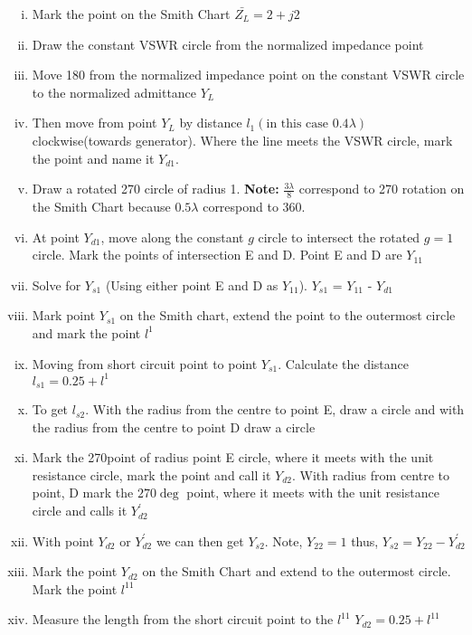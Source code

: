 \begin{exmp}
\begin{enumerate}[(i)]
\item Mark the point on the Smith Chart $\bar{Z_{L}} = 2 + j2$  
\item Draw the constant VSWR circle from the normalized impedance point
\item Move 180\textdegree\; from the normalized impedance point on the constant VSWR circle to the normalized admittance $Y_{L}$
\item Then move from point $Y_{L}$ by distance $l_{1}(\text{in this case } 0.4\lambda)$ clockwise(towards generator). Where the line meets the VSWR circle, mark the point and name it $Y_{d1}$.           
\item Draw a rotated 270\textdegree\; circle of radius 1. \textbf{Note:} $\frac{3\lambda}{8}$ correspond to 270\textdegree\; rotation on the Smith Chart because $0.5\lambda$ correspond to 360\textdegree.
\item At point $Y_{d1}$, move along the constant $g$ circle to intersect the rotated $g = 1$ circle. Mark the points of intersection E and D.  Point E and D are $Y_{11}$                        
\item Solve for $Y_{s1}$ (Using either point E and D as $Y_{11}$). $Y_{s1}$ =  $Y_{11}$ -  $Y_{d1}$           
\item Mark point $Y_{s1}$ on the Smith chart, extend the point to the outermost circle and mark the point $l^{1}$ 
\item Moving from short circuit point to point $Y_{s1}$. Calculate the distance
$ l_{s1} = 0.25 + l^{1} $                                    
\item To get $l_{s2}$. With the radius from the centre to point E, draw a circle and with the radius from the centre to point D draw a circle
\item Mark the 270\textdegree point of radius point E circle, where it meets with the unit resistance circle, mark the point and call it $Y_{d2}$. With radius from centre to point, D mark the $270\deg$ point, where it meets with the unit resistance circle and calls it $Y_{d2}^{'}$ 
\item With point $Y_{d2}$ or $Y_{d2}^{'}$ we can then get $Y_{s2}$. Note, $Y_{22}=1$ thus, $Y_{s2}=Y_{22}-Y_{d2}^{'}$
\item Mark the point $Y_{d2}$ on the Smith Chart and extend to the outermost circle. Mark the point $l^{11}$
\item Measure the length from the short circuit point to the $l^{11}$ $Y_{d2} = 0.25 + l^{11}$
\end{enumerate}
\end{exmp}


